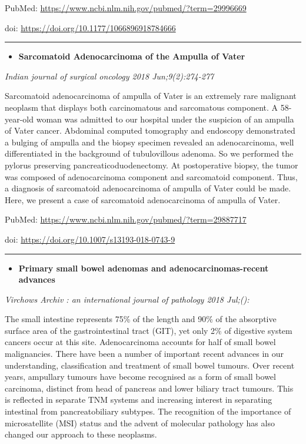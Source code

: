 \documentclass[]{article}
\providecommand{\tightlist}{%
  \setlength{\itemsep}{0pt}\setlength{\parskip}{0pt}}
\begin{document}
PubMed: \url{https://www.ncbi.nlm.nih.gov/pubmed/?term=29996669}

doi: \url{https://doi.org/10.1177/1066896918784666}

{}

{}

\begin{center}\rule{0.5\linewidth}{\linethickness}\end{center}

\begin{itemize}
\tightlist
\item
  \textbf{Sarcomatoid Adenocarcinoma of the Ampulla of Vater}
\end{itemize}

\emph{Indian journal of surgical oncology 2018 Jun;9(2):274-277}

Sarcomatoid adenocarcinoma of ampulla of Vater is an extremely rare
malignant neoplasm that displays both carcinomatous and sarcomatous
component. A 58-year-old woman was admitted to our hospital under the
suspicion of an ampulla of Vater cancer. Abdominal computed tomography
and endoscopy demonstrated a bulging of ampulla and the biopsy specimen
revealed an adenocarcinoma, well differentiated in the background of
tubulovillous adenoma. So we performed the pylorus preserving
pancreaticoduodenectomy. At postoperative biopsy, the tumor was composed
of adenocarcinoma component and sarcomatoid component. Thus, a diagnosis
of sarcomatoid adenocarcinoma of ampulla of Vater could be made. Here,
we present a case of sarcomatoid adenocarcinoma of ampulla of Vater.

PubMed: \url{https://www.ncbi.nlm.nih.gov/pubmed/?term=29887717}

doi: \url{https://doi.org/10.1007/s13193-018-0743-9}

{}

{}

\begin{center}\rule{0.5\linewidth}{\linethickness}\end{center}

\begin{itemize}
\tightlist
\item
  \textbf{Primary small bowel adenomas and adenocarcinomas-recent
  advances}
\end{itemize}

\emph{Virchows Archiv : an international journal of pathology 2018
Jul;():}

The small intestine represents 75\% of the length and 90\% of the
absorptive surface area of the gastrointestinal tract (GIT), yet only
2\% of digestive system cancers occur at this site. Adenocarcinoma
accounts for half of small bowel malignancies. There have been a number
of important recent advances in our understanding, classification and
treatment of small bowel tumours. Over recent years, ampullary tumours
have become recognised as a form of small bowel carcinoma, distinct from
head of pancreas and lower biliary tract tumours. This is reflected in
separate TNM systems and increasing interest in separating intestinal
from pancreatobiliary subtypes. The recognition of the importance of
microsatellite (MSI) status and the advent of molecular pathology has
also changed our approach to these neoplasms.
\end{document}
